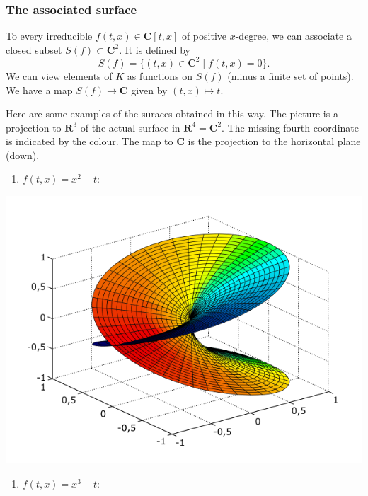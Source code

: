 \documentclass[11pt]{article}
\begin{document}
\subsubsection{The associated surface}
\label{sec:orgc532c2a}
To every irreducible \(f(t,x) \in \mathbf{C}[t,x]\) of positive \(x\)-degree, we can associate a closed subset \(S(f) \subset \mathbf{C}^2\).
It is defined by
\[ S(f) = \{(t,x) \in \mathbf{C}^2 \mid f(t,x) = 0\}.\]
We can view elements of \(K\) as functions on \(S(f)\) (minus a finite set of points).
We have a map \(S(f) \to \mathbf{C}\) given by \((t,x) \mapsto t\).

Here are some examples of the suraces obtained in this way.
The picture is a projection to \(\mathbf{R}^3\) of the actual surface in \(\mathbf{R}^4 = \mathbf{C}^2\).
The missing fourth coordinate is indicated by the colour.
The map to \(\mathbf{C}\) is the projection to the horizontal plane (down).

\begin{enumerate}
\item \(f(t,x) = x^2 - t\):
\end{enumerate}
\begin{center}
\includegraphics[width=.9\linewidth]{assets/Course_notes/2023-03-24_14-32-34_620px-Riemann_sqrt.svg.png}
\end{center}


\begin{enumerate}
\item \(f(t,x) = x^3 - t\):
\end{enumerate}
\end{document}

